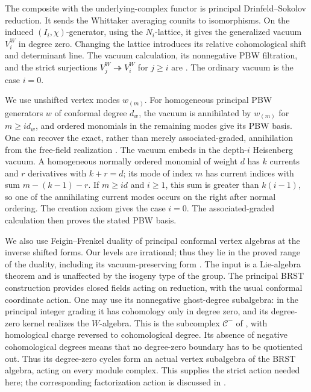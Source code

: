 \documentclass[11pt]{article}
\numberwithin{equation}{section}
\theoremstyle{definition}
\theoremstyle{remark}
\begin{document}
The composite with the underlying-complex functor is principal
Drinfeld--Sokolov reduction.  It sends the Whittaker averaging
counits to isomorphisms.  On the induced \((I_i,\chi)\)-generator,
using the \(N_i\)-lattice, it gives the generalized vacuum \(V_i^W\)
in degree zero.  Changing the lattice introduces its relative
cohomological shift and determinant line.  The vacuum calculation,
its nonnegative PBW filtration, and the strict surjections
\(V_j^W\twoheadrightarrow V_i^W\) for \(j\geq i\) are
\cite[Theorems~4.2.1, 4.5.1, and 4.6.1]{RaskinW}.
The ordinary vacuum is the case \(i=0\).

We use unshifted vertex modes \(w_{(m)}\).  For homogeneous principal
PBW generators \(w\) of conformal degree \(d_w\), the vacuum is
annihilated by \(w_{(m)}\) for \(m\geq i d_w\), and ordered
monomials in the remaining modes give its PBW basis.  One can recover
the exact, rather than merely associated-graded, annihilation from
the free-field realization \cite[Theorem~6.1.1]{RaskinW}.  The vacuum
embeds in the depth-\(i\) Heisenberg vacuum.  A homogeneous
normally ordered monomial of weight \(d\) has \(k\) currents and
\(r\) derivatives with \(k+r=d\); its mode of index \(m\) has
current indices with sum \(m-(k-1)-r\).  If \(m\geq id\) and
\(i\geq1\), this sum is greater than \(k(i-1)\), so one of the
annihilating current modes occurs on the right after normal ordering.
The creation axiom gives the case \(i=0\).  The associated-graded
calculation then proves the stated PBW basis.

We also use Feigin--Frenkel duality of principal conformal vertex
algebras at the inverse shifted forms.  Our levels are irrational;
thus they lie in the proved range of the duality, including its
vacuum-preserving form \cite[Section~7.3, especially Warning~7.3.1
and Lemma~7.3.3]{RaskinW}.  The input is a Lie-algebra theorem and
is unaffected by the isogeny type of the group.  The principal BRST
construction provides closed fields acting on reduction, with the
usual conformal coordinate action.  One may use its nonnegative
ghost-degree subalgebra: in the principal integer grading it has
cohomology only in degree zero, and its degree-zero kernel realizes
the \(W\)-algebra.  This is the subcomplex \(\mathcal C^-\) of
\cite[Section~4, Theorem~4.1 and Remark~4.1]{KacWakimoto}, with
homological charge reversed to cohomological degree.  Its absence
of negative cohomological degrees means that no degree-zero boundary
has to be quotiented out.  Thus its degree-zero cycles form an actual
vertex subalgebra of the BRST algebra, acting on every module complex.
This supplies the strict action needed here; the corresponding
factorization action is discussed in \cite[Section~4.4]{RaskinW}.
\end{document}

